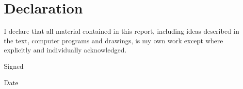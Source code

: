 
\chapter*{Declaration}

I declare that all material contained in this report, including ideas described in the
text, computer programs and drawings, is my own work except where explicitly and
individually acknowledged.

\vspace{2cm}

\noindent Signed \dotfill

\vspace{1cm}

\noindent Date \dotfill
